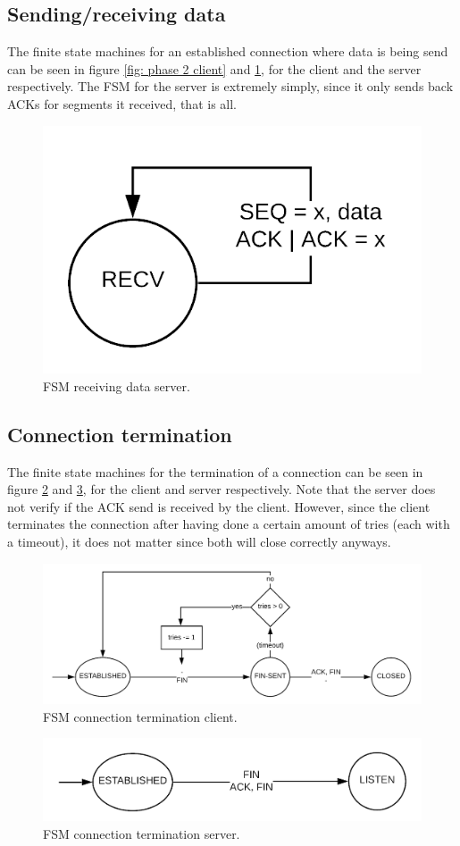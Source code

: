 \documentclass[a4paper]{article}
\begin{document}
	\subsection{Sending/receiving data}
	The finite state machines for an established connection where data is being send can be seen in figure \ref{fig: phase 2 client} and \ref{fig: phase 2 server}, for the client and the server respectively. The FSM for the server is extremely simply, since it only sends back ACKs for segments it received, that is all.
	\begin{figure}[h]
		\centering
		\includegraphics[width = .3\textwidth]{phase2_server.png}
		\caption{FSM receiving data server.}
		\label{fig: phase 2 server}
	\end{figure}

	\subsection{Connection termination}
	The finite state machines for the termination of a connection can be seen in figure \ref{fig: phase 3 client} and \ref{fig: phase 3 server}, for the client and server respectively. Note that the server does not verify if the ACK send is received by the client. However, since the client terminates the connection after having done a certain amount of tries (each with a timeout), it does not matter since both will close correctly anyways.
	\begin{figure}[h]
		\centering
		\includegraphics[width = \textwidth]{phase3_client.png}
		\caption{FSM connection termination client.}
		\label{fig: phase 3 client}
	\end{figure}
	\begin{figure}[h]
		\centering
		\includegraphics[width = .7\textwidth]{phase3_server.png}
		\caption{FSM connection termination server.}
		\label{fig: phase 3 server}
	\end{figure}
\end{document}
